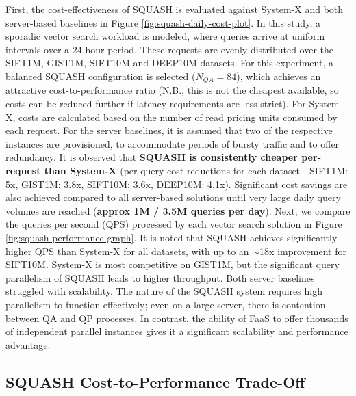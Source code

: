 First, the cost-effectiveness of SQUASH is evaluated against System-X and both server-based baselines in Figure \ref{fig:squash-daily-cost-plot}.
In this study, a sporadic vector search workload is modeled, where queries arrive at uniform intervals over a 24 hour period. 
These requests are evenly distributed over the SIFT1M, GIST1M, SIFT10M and DEEP10M datasets. 
For this experiment, a balanced SQUASH configuration is selected ($N_{QA} = 84$), which achieves an attractive cost-to-performance ratio (N.B., this is not the cheapest available, so costs can be reduced further if latency requirements are less strict). 
For System-X, costs are calculated based on the number of read pricing units consumed by each request. 
For the server baselines, it is assumed that two of the respective instances are provisioned, to accommodate periods of bursty traffic and to offer redundancy.
It is observed that \textbf{SQUASH is consistently cheaper per-request than System-X} (per-query cost reductions for each dataset - SIFT1M: 5x, GIST1M: 3.8x, SIFT10M: 3.6x, DEEP10M: 4.1x).
Significant cost savings are also achieved compared to all server-based solutions until very large daily query volumes are reached (\textbf{approx 1M / 3.5M queries per day}).
Next, we compare the queries per second (QPS) processed by each vector search solution in Figure \ref{fig:squash-performance-graph}. 
It is noted that SQUASH achieves significantly higher QPS than System-X for all datasets, with up to an $\sim$18x improvement for SIFT10M. System-X is most competitive on GIST1M, but the significant query parallelism of SQUASH leads to higher throughput. 
Both server baselines struggled with scalability. The nature of the SQUASH system requires high parallelism to function effectively; even on a large server, there is contention between QA and QP processes. In contrast, the ability of FaaS to offer thousands of independent parallel instances gives it a significant scalability and performance advantage.




\subsection{SQUASH Cost-to-Performance Trade-Off}

